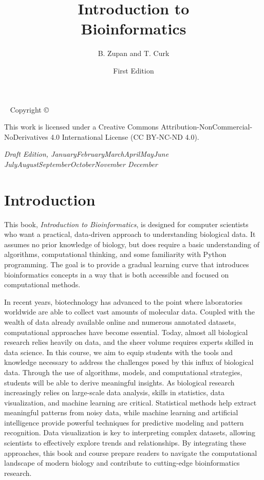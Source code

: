 \documentclass[nohyper,nobib]{tufte-book}
\title{Introduction to \\ Bioinformatics}
\date{First Edition}
\author[Bla\v{z} Zupan and Toma\v{z} Curk]{B. Zupan and T. Curk}
\newcommand{\monthyear}{%
  \ifcase\month\or January\or February\or March\or April\or May\or June\or
  July\or August\or September\or October\or November\or
  December\fi\space\number\year
}
\begin{document}
\frontmatter

\maketitle


\newpage
\begin{fullwidth}
~\vfill
\thispagestyle{empty}
\setlength{\parindent}{0pt}
\setlength{\parskip}{\baselineskip}
Copyright \copyright\ \the\year\ \thanklessauthor

\par{}

\par This work is licensed under a Creative Commons Attribution-NonCommercial-NoDerivatives 4.0 International License (CC BY-NC-ND 4.0).

\par\textit{Draft Edition, \monthyear}
\end{fullwidth}

\tableofcontents


\cleardoublepage
\chapter*{Introduction}

This book, {\em Introduction to Bioinformatics}, is designed for computer scientists who want a practical, data-driven approach to understanding biological data. It assumes no prior knowledge of biology, but does require a basic understanding of algorithms, computational thinking, and some familiarity with Python programming. The goal is to provide a gradual learning curve that introduces bioinformatics concepts in a way that is both accessible and focused on computational methods.

In recent years, biotechnology has advanced to the point where laboratories worldwide are able to collect vast amounts of molecular data. Coupled with the wealth of data already available online and numerous annotated datasets, computational approaches have become essential. Today, almost all biological research relies heavily on data, and the sheer volume requires experts skilled in data science.
In this course, we aim to equip students with the tools and knowledge necessary to address the challenges posed by this influx of biological data. Through the use of algorithms, models, and computational strategies, students will be able to derive meaningful insights. As biological research increasingly relies on large-scale data analysis, skills in statistics, data visualization, and machine learning are critical. Statistical methods help extract meaningful patterns from noisy data, while machine learning and artificial intelligence provide powerful techniques for predictive modeling and pattern recognition. Data visualization is key to interpreting complex datasets, allowing scientists to effectively explore trends and relationships. By integrating these approaches, this book and course prepare readers to navigate the computational landscape of modern biology and contribute to cutting-edge bioinformatics research.
\end{document}
